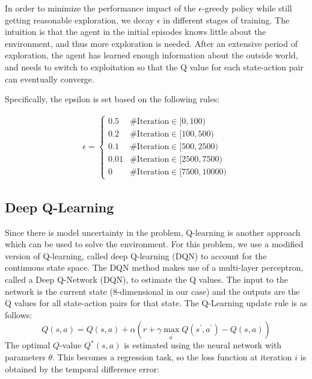 \documentclass[10pt, conference]{IEEEtran}
\begin{document}
In order to minimize the performance impact of the $\epsilon$-greedy policy while still getting reasonable exploration, we decay $\epsilon$ in different stages of training. The intuition is that the agent in the initial episodes knows little about the environment, and thus more exploration is needed. After an extensive period of exploration, the agent has learned enough information about the outside world, and needs to switch to exploitation so that the Q value for each state-action pair can eventually converge.

Specifically, the epsilon is set based on the following rules:


    \begin{align*}
        \epsilon=\left\{
        \begin{array}{ll}
            0.5 & \text{\#Iteration} \in [0, 100) \\
            0.2 & \text{\#Iteration} \in [100, 500) \\
            0.1 & \text{\#Iteration} \in [500, 2500) \\
            0.01 & \text{\#Iteration} \in [2500, 7500) \\
            0 & \text{\#Iteration} \in [7500, 10000)
        \end{array}
        \right.
    \end{align*}

\subsection{Deep Q-Learning}
Since there is model uncertainty in the problem, Q-learning is another approach which can be used to solve the environment. For this problem, we use a modified version of Q-learning, called deep Q-learning (DQN) \cite{mnih2013playing, mnih2015human} to account for the continuous state space. The DQN method makes use of a multi-layer perceptron, called a Deep Q-Network (DQN), to estimate the Q values. The input to the network is the current state (8-dimensional in our case) and the outputs are the Q values for all state-action pairs for that state. The Q-Learning update rule is as follows:
\begin{equation}    
Q(s,a) = Q(s, a) + \alpha(r + \gamma \max\limits_{a^{\prime}}Q(s^{\prime}, a^{\prime}) - Q(s, a))
\end{equation}
The optimal $Q$-value $Q^{*}(s,a)$ is estimated using the neural network with parameters $\theta$. This becomes a regression task, so the loss function at iteration $i$ is obtained by the temporal difference error:
\end{document}
